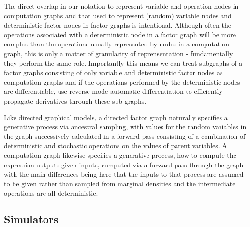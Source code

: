 

The direct overlap in our notation to represent variable and operation nodes in computation graphs and that used to represent (random) variable nodes and deterministic factor nodes in factor graphs is intentional. Although often the operations associated with a deterministic node in a factor graph will be more complex than the operations usually represented by nodes in a computation graph, this is only a matter of granularity of reprensentation - fundamentally they perform the same role. Importantly this means we can treat subgraphs of a factor graphs consisting of only variable and deterministic factor nodes as computation graphs and if the operations performed by the deterministic nodes are differentiable, use reverse-mode automatic differentiation to efficiently propagate derivatives through these sub-graphs.


Like directed graphical models, a directed factor graph naturally specifies a generative process via ancestral sampling, with values for the random variables in the graph successively calculated in a forward pass consisting of a combination of deterministic and stochastic operations on the values of parent variables. A computation graph likewise specifies a generative process, how to compute the expression outputs given inputs, computed via a forward pass through the graph with the main differences being here that the inputs to that process are assumed to be given rather than sampled from marginal densities and the intermediate operations are all deterministic.

\subsection{Simulators}\label{subsec:simulators}

